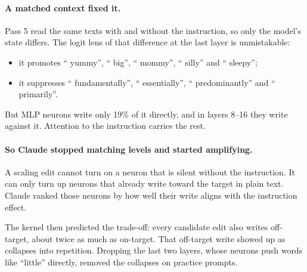 \paragraph{A matched context fixed it.}
Pass 5 read the same texts with and without the instruction, so only the model's state differs. The logit lens of that difference at the last layer is unmistakable:
\begin{itemize}
\item it promotes `` yummy'', `` big'', `` mommy'', `` silly'' and `` sleepy'';
\item it suppresses `` fundamentally'', `` essentially'', `` predominantly'' and `` primarily''.
\end{itemize}
But MLP neurons write only 19\% of it directly, and in layers 8--16 they write against it. Attention to the instruction carries the rest.

\paragraph{So Claude stopped matching levels and started amplifying.}
A scaling edit cannot turn on a neuron that is silent without the instruction. It can only turn up neurons that already write toward the target in plain text. Claude ranked those neurons by how well their write aligns with the instruction effect.

The kernel then predicted the trade-off: every candidate edit also writes off-target, about twice as much as on-target. That off-target write showed up as collapses into repetition. Dropping the last two layers, whose neurons push words like ``little'' directly, removed the collapses on practice prompts.


